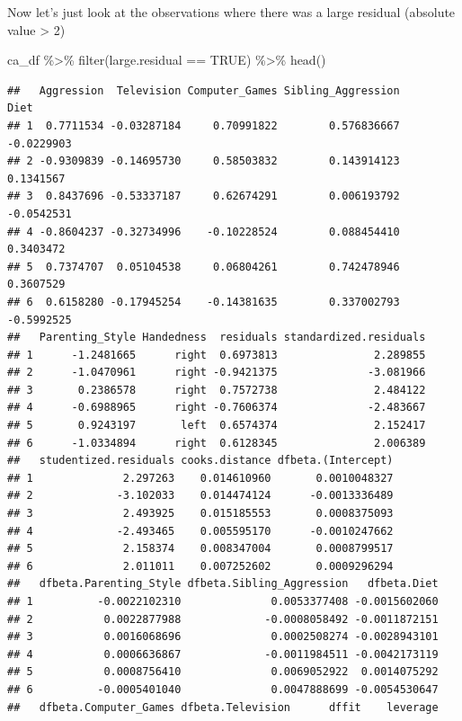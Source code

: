 \documentclass[
]{book}
\newenvironment{Shaded}{\begin{snugshade}}{\end{snugshade}}
\newcommand{\ConstantTok}[1]{\textcolor[rgb]{0.00,0.00,0.00}{#1}}
\newcommand{\FunctionTok}[1]{\textcolor[rgb]{0.00,0.00,0.00}{#1}}
\newcommand{\NormalTok}[1]{#1}
\newcommand{\SpecialCharTok}[1]{\textcolor[rgb]{0.00,0.00,0.00}{#1}}
\begin{document}
Now let's just look at the observations where there was a large residual (absolute value \textgreater{} 2)

\begin{Shaded}
\begin{Highlighting}[]
\NormalTok{ca\_df }\SpecialCharTok{\%\textgreater{}\%} \FunctionTok{filter}\NormalTok{(large.residual }\SpecialCharTok{==} \ConstantTok{TRUE}\NormalTok{) }\SpecialCharTok{\%\textgreater{}\%} \FunctionTok{head}\NormalTok{()}
\end{Highlighting}
\end{Shaded}

\begin{verbatim}
##   Aggression  Television Computer_Games Sibling_Aggression       Diet
## 1  0.7711534 -0.03287184     0.70991822        0.576836667 -0.0229903
## 2 -0.9309839 -0.14695730     0.58503832        0.143914123  0.1341567
## 3  0.8437696 -0.53337187     0.62674291        0.006193792 -0.0542531
## 4 -0.8604237 -0.32734996    -0.10228524        0.088454410  0.3403472
## 5  0.7374707  0.05104538     0.06804261        0.742478946  0.3607529
## 6  0.6158280 -0.17945254    -0.14381635        0.337002793 -0.5992525
##   Parenting_Style Handedness  residuals standardized.residuals
## 1      -1.2481665      right  0.6973813               2.289855
## 2      -1.0470961      right -0.9421375              -3.081966
## 3       0.2386578      right  0.7572738               2.484122
## 4      -0.6988965      right -0.7606374              -2.483667
## 5       0.9243197       left  0.6574374               2.152417
## 6      -1.0334894      right  0.6128345               2.006389
##   studentized.residuals cooks.distance dfbeta.(Intercept)
## 1              2.297263    0.014610960       0.0010048327
## 2             -3.102033    0.014474124      -0.0013336489
## 3              2.493925    0.015185553       0.0008375093
## 4             -2.493465    0.005595170      -0.0010247662
## 5              2.158374    0.008347004       0.0008799517
## 6              2.011011    0.007252602       0.0009296294
##   dfbeta.Parenting_Style dfbeta.Sibling_Aggression   dfbeta.Diet
## 1          -0.0022102310              0.0053377408 -0.0015602060
## 2           0.0022877988             -0.0008058492 -0.0011872151
## 3           0.0016068696              0.0002508274 -0.0028943101
## 4           0.0006636867             -0.0011984511 -0.0042173119
## 5           0.0008756410              0.0069052922  0.0014075292
## 6          -0.0005401040              0.0047888699 -0.0054530647
##   dfbeta.Computer_Games dfbeta.Television      dffit    leverage

\end{verbatim}
\end{document}
